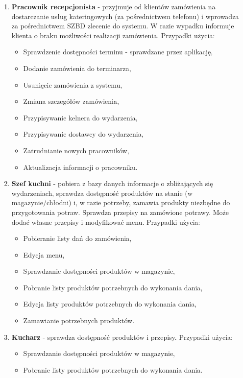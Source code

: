 \documentclass[10pt]{article}
\begin{document}
\begin{enumerate}
    \item \textbf{Pracownik recepcjonista} - przyjmuje od klientów zamówienia na dostarczanie usług kateringowych (za pośrednictwem telefonu) i wprowadza za pośrednictwem SZBD zlecenie do systemu. W razie wypadku informuje klienta o braku możliwości realizacji zamówienia. Przypadki użycia:
    \begin{itemize}
        \item Sprawdzenie dostępności terminu - sprawdzane przez aplikację,
        \item Dodanie zamówienia do terminarza,
        \item Usunięcie zamówienia z systemu,
        \item Zmiana szczegółów zamówienia,
        \item Przypisywanie kelnera do wydarzenia,
        \item Przypisywanie dostawcy do wydarzenia,
        \item Zatrudnianie nowych pracowników,
        \item Aktualizacja informacji o pracowniku.
    \end{itemize}

    \item \textbf{Szef kuchni} - pobiera z bazy danych informacje o zbliżających się wydarzeniach, sprawdza dostępność produktów na stanie (w magazynie/chłodni) i, w razie potrzeby, zamawia produkty niezbędne do przygotowania potraw. Sprawdza przepisy na zamówione potrawy. Może dodać własne przepisy i modyfikować menu. Przypadki użycia:
    \begin{itemize}
        \item Pobieranie listy dań do zamówienia,
        \item Edycja menu,
        \item Sprawdzanie dostępności produktów w magazynie,
        \item Pobranie listy produktów potrzebnych do wykonania dania,
        \item Edycja listy produktów potrzebnych do wykonania dania,
        \item Zamawianie potrzebnych produktów.
    \end{itemize}
    
    \item \textbf{Kucharz} - sprawdza dostępność produktów i przepisy. Przypadki użycia:
    \begin{itemize}
        \item Sprawdzanie dostępności produktów w magazynie,
        \item Pobranie listy produktów potrzebnych do wykonania dania.
    \end{itemize}
    

\end{enumerate}
\end{document}
